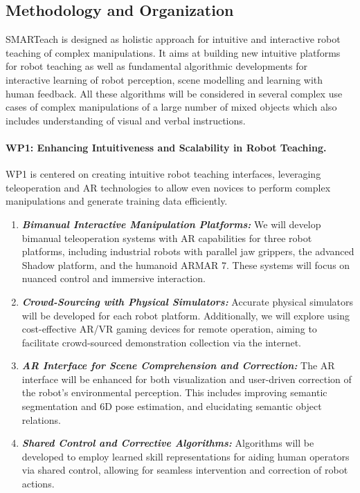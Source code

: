 \begin{refsection}
\subsection{Methodology and Organization}
SMARTeach is designed as holistic approach for intuitive and interactive robot teaching of complex manipulations. It aims at building new intuitive platforms for robot teaching as well as fundamental algorithmic developments for interactive learning of robot perception, scene modelling and learning with human feedback. All these algorithms will be considered in several complex use cases of complex manipulations of a large number of mixed objects which also includes understanding of visual and verbal instructions. 
\vspace{-0.3cm}
\paragraph{WP1: Enhancing Intuitiveness and Scalability in Robot Teaching.} WP1 is centered on creating intuitive robot teaching interfaces, leveraging teleoperation and AR technologies to allow even novices to perform complex manipulations and generate training data efficiently. 
\begin{enumerate}[noitemsep, topsep=0pt, partopsep=0pt, label=\alph*), leftmargin=0em, itemindent=1em, labelindent=1em, labelwidth=*]
\item \textit{\textbf{Bimanual Interactive Manipulation Platforms:}} We will develop bimanual teleoperation systems with AR capabilities for three robot platforms, including industrial robots with parallel jaw grippers, the advanced Shadow platform, and the humanoid ARMAR 7. These systems will focus on nuanced control and immersive interaction. 
\item \textit{\textbf{Crowd-Sourcing with Physical Simulators:}} Accurate physical simulators will be developed for each robot platform. Additionally, we will explore using cost-effective AR/VR gaming devices for remote operation, aiming to facilitate crowd-sourced demonstration collection via the internet. 
\item \textit{\textbf{AR Interface for Scene Comprehension and Correction:}} The AR interface will be enhanced for both visualization and user-driven correction of the robot’s environmental perception. This includes improving semantic segmentation and 6D pose estimation, and elucidating semantic object relations. 
\item \textit{\textbf{Shared Control and Corrective Algorithms:}} Algorithms will be developed to employ learned skill representations for aiding human operators via shared control, allowing for seamless intervention and correction of robot actions.
\end{enumerate}
\vspace{-0.3cm}

\end{refsection}
